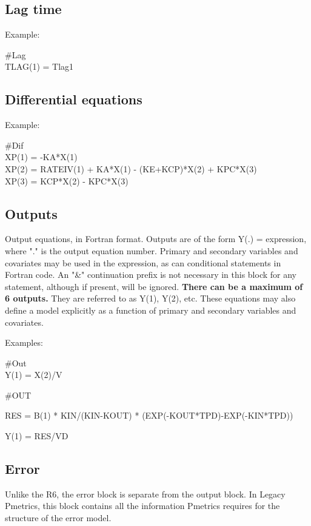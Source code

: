 \documentclass[
]{book}
\begin{document}
\hypertarget{lag}{%
\subsection{Lag time}\label{lag}}

Example:

\#Lag\\
TLAG(1) = Tlag1

\hypertarget{dif}{%
\subsection{Differential equations}\label{dif}}

Example:

\#Dif\\
XP(1) = -KA*X(1)\\
XP(2) = RATEIV(1) + KA*X(1) - (KE+KCP)*X(2) + KPC*X(3)\\
XP(3) = KCP*X(2) - KPC*X(3)

\hypertarget{out}{%
\subsection{Outputs}\label{out}}

Output equations, in Fortran format. Outputs are of the form Y(.) =
expression, where "." is the output equation number. Primary and
secondary variables and covariates may be used in the expression, as can
conditional statements in Fortran code. An "\&" continuation prefix is
not necessary in this block for any statement, although if present, will
be ignored. \textbf{There can be a maximum of 6 outputs.} They are referred
to as Y(1), Y(2), etc. These equations may also define a model
explicitly as a function of primary and secondary variables and
covariates.

Examples:

\#Out\\
Y(1) = X(2)/V

\#OUT

RES = B(1) * KIN/(KIN-KOUT) * (EXP(-KOUT*TPD)-EXP(-KIN*TPD))

Y(1) = RES/VD

\hypertarget{err}{%
\subsection{Error}\label{err}}

Unlike the R6, the error block is separate from the output block. In Legacy Pmetrics, this block contains all the information Pmetrics requires for the
structure of the error model.
\end{document}
